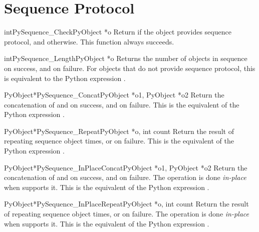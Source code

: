 \documentclass{manual}
\begin{document}
\section{Sequence Protocol \label{sequence}}

\begin{cfuncdesc}{int}{PySequence_Check}{PyObject *o}
Return  if the object provides sequence protocol, and
 otherwise.  This function always succeeds.
\end{cfuncdesc}

\begin{cfuncdesc}{int}{PySequence_Length}{PyObject *o}
Returns the number of objects in sequence  on success, and
 on failure.  For objects that do not provide sequence
protocol, this is equivalent to the Python expression
.
\end{cfuncdesc}

\begin{cfuncdesc}{PyObject*}{PySequence_Concat}{PyObject *o1, PyObject *o2}
Return the concatenation of  and  on success, and \NULL{} on
failure.   This is the equivalent of the Python
expression .
\end{cfuncdesc}


\begin{cfuncdesc}{PyObject*}{PySequence_Repeat}{PyObject *o, int count}
Return the result of repeating sequence object
  times, or \NULL{} on failure.  This is the
equivalent of the Python expression .
\end{cfuncdesc}

\begin{cfuncdesc}{PyObject*}{PySequence_InPlaceConcat}{PyObject *o1, PyObject *o2}
Return the concatenation of  and  on success, and \NULL{} on
failure.  The operation is done \emph{in-place} when  supports it. 
This is the equivalent of the Python expression .
\end{cfuncdesc}


\begin{cfuncdesc}{PyObject*}{PySequence_InPlaceRepeat}{PyObject *o, int count}
Return the result of repeating sequence object   times, or
\NULL{} on failure.  The operation is done \emph{in-place} when 
supports it.  This is the equivalent of the Python expression .
\end{cfuncdesc}
\end{document}
